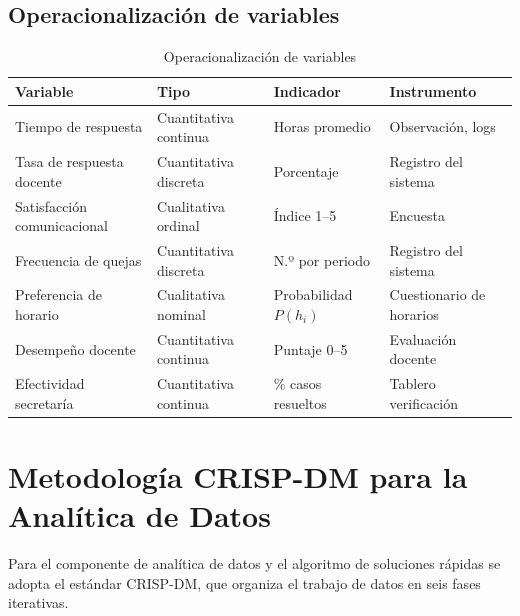 \subsection{Operacionalización de variables}
\begin{table}[H]
\centering
\caption{Operacionalización de variables}
\label{tab:variables}
\small
\begin{tabularx}{\textwidth}{@{}l l l X@{}}
\toprule
\rowcolor{azulClaro}
\textbf{Variable} & \textbf{Tipo} & \textbf{Indicador} & \textbf{Instrumento} \\
\midrule
Tiempo de respuesta & Cuantitativa continua & Horas promedio & Observación, logs \\
Tasa de respuesta docente & Cuantitativa discreta & Porcentaje & Registro del sistema \\
Satisfacción comunicacional & Cualitativa ordinal & Índice 1--5 & Encuesta \\
Frecuencia de quejas & Cuantitativa discreta & N.º por periodo & Registro del sistema \\
Preferencia de horario & Cualitativa nominal & Probabilidad $P(h_i)$ & Cuestionario de horarios \\
Desempeño docente & Cuantitativa continua & Puntaje 0--5 & Evaluación docente \\
Efectividad secretaría & Cuantitativa continua & $\%$ casos resueltos & Tablero verificación \\
\bottomrule
\end{tabularx}
\end{table}

\section{Metodología CRISP-DM para la Analítica de Datos}

Para el componente de analítica de datos y el algoritmo de soluciones rápidas se
adopta el estándar \ac{CRISP-DM}, que organiza el trabajo de datos en seis fases
iterativas.

